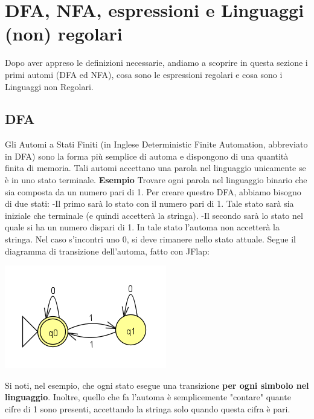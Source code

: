 \documentclass[]{article}
\begin{document}
	\section{DFA, NFA, espressioni e Linguaggi (non) regolari}
		Dopo aver appreso le definizioni necessarie, andiamo a scoprire in questa sezione i primi automi (DFA ed NFA), cosa sono le espressioni regolari e cosa sono i Linguaggi non Regolari.
		\subsection{DFA}
			Gli Automi a Stati Finiti (in Inglese Deterministic Finite Automation, abbreviato in DFA) sono la forma più semplice di automa e dispongono di una quantità finita di memoria.
			Tali automi accettano una parola nel linguaggio unicamente se è in uno stato terminale.
			\newline
			\newline
			\textbf{Esempio}
			Trovare ogni parola nel linguaggio binario che sia composta da un numero pari di 1.\newline
			Per creare questro DFA, abbiamo bisogno di due stati:\newline
			-Il primo sarà lo stato con il numero pari di 1. Tale stato sarà sia iniziale che terminale (e quindi accetterà la stringa).\newline
			-Il secondo sarà lo stato nel quale si ha un numero dispari di 1. In tale stato l'automa non accetterà la stringa.\newline
			Nel caso s'incontri uno 0, si deve rimanere nello stato attuale.\newline
			Segue il diagramma di transizione dell'automa, fatto con JFlap:
			\newline
			\begin{center}
				\includegraphics{DFA1.png}
			\end{center}
			Si noti, nel esempio, che ogni stato esegue una transizione \textbf{per ogni simbolo nel linguaggio}. Inoltre, quello che fa l'automa è semplicemente "contare" quante cifre di 1 sono presenti, accettando la stringa solo quando questa cifra è pari.\newline
\end{document}
